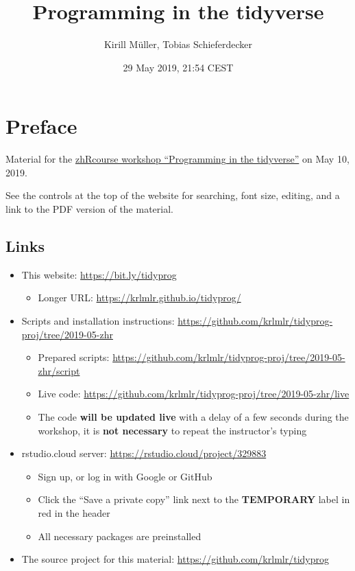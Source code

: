 \documentclass[]{book}
\title{Programming in the tidyverse}
\author{Kirill Müller, Tobias Schieferdecker}
\date{29 May 2019, 21:54 CEST}
\providecommand{\tightlist}{%
  \setlength{\itemsep}{0pt}\setlength{\parskip}{0pt}}
\begin{document}
\maketitle

{
\setcounter{tocdepth}{1}
\tableofcontents
}
\hypertarget{preface}{%
\chapter*{Preface}\label{preface}}

Material for the \href{https://www.zhrcourses.uzh.ch/en/programm2019/tidyverse.html}{zhRcourse workshop ``Programming in the tidyverse''} on May 10, 2019.

See the controls at the top of the website for searching, font size, editing, and a link to the PDF version of the material.

\hypertarget{links}{%
\section*{Links}\label{links}}

\begin{itemize}
\tightlist
\item
  This website: \url{https://bit.ly/tidyprog}

  \begin{itemize}
  \tightlist
  \item
    Longer URL: \url{https://krlmlr.github.io/tidyprog/}
  \end{itemize}
\item
  Scripts and installation instructions: \url{https://github.com/krlmlr/tidyprog-proj/tree/2019-05-zhr}

  \begin{itemize}
  \tightlist
  \item
    Prepared scripts: \url{https://github.com/krlmlr/tidyprog-proj/tree/2019-05-zhr/script}
  \item
    Live code: \url{https://github.com/krlmlr/tidyprog-proj/tree/2019-05-zhr/live}
  \item
    The code \textbf{will be updated live} with a delay of a few seconds during the workshop, it is \textbf{not necessary} to repeat the instructor's typing
  \end{itemize}
\item
  rstudio.cloud server: \url{https://rstudio.cloud/project/329883}

  \begin{itemize}
  \tightlist
  \item
    Sign up, or log in with Google or GitHub
  \item
    Click the ``Save a private copy'' link next to the \textbf{TEMPORARY} label in red in the header
  \item
    All necessary packages are preinstalled
  \end{itemize}
\item
  The source project for this material: \url{https://github.com/krlmlr/tidyprog}
\end{itemize}
\end{document}
